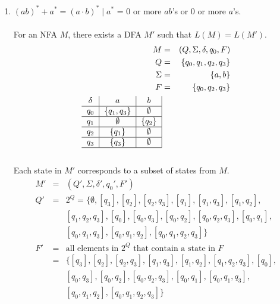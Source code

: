 \documentclass[8pt,letterpaper,twocolumn]{article}
\begin{document}
\begin{enumerate}
  \item $(ab)^* + a^* = (a \cdot b)^* \mid a^*$ = 0 or more $ab$'s or 0 or more $a$'s.\\
  \\
  For an NFA $M$, there exists a DFA $M'$ such that $L(M) = L(M')$.
  \begin{eqnarray*}
    M &=& (Q, \Sigma, \delta, q_0, F)\\
    Q &=& \{q_0,q_1,q_2,q_3\}\\
    \Sigma &=& \{a,b\}\\
    F &=& \{q_0,q_2,q_3\}\\
    \begin{tabular}{c|c|c|}
    $\delta$ & $a$ & $b$ \\ 
    \hline 
    $q_0$ & $\{q_1,q_3\}$ & $\emptyset$ \\
    \hline 
    $q_1$ & $\emptyset$ & $\{q_2\}$ \\ 
    \hline 
    $q_2$ & $\{q_1\}$ & $\emptyset$ \\ 
    \hline 
    $q_3$ & $\{q_3\}$ & $\emptyset$ \\ 
    \hline 
    \end{tabular} 
  \end{eqnarray*}
\\
  Each state in $M'$ corresponds to a subset of states from $M$.
  \begin{eqnarray*}
   M' &=& (Q', \Sigma, \delta', q_0', F')\\
   Q' &=& 2^Q = \{\emptyset, [q_3], [q_2], [q_2,q_3], [q_1], [q_1,q_3],[q_1,q_2],\\
   & & [q_1,q_2,q_3],[q_0], [q_0,q_3], [q_0,q_2], [q_0,q_2,q_3], [q_0,q_1],\\
   & & [q_0,q_1,q_3], [q_0,q_1,q_2], [q_0,q_1,q_2,q_3]\}\\
   F' &=& \mbox{all elements in $2^Q$ that contain a state in $F$}\\
   &=& \{[q_3], [q_2], [q_2,q_3], [q_1,q_3], [q_1,q_2], [q_1,q_2,q_3], [q_0],\\
   & & [q_0,q_3], [q_0,q_2], [q_0,q_2,q_3], [q_0,q_1], [q_0,q_1,q_3],\\
   & & [q_0,q_1,q_2], [q_0,q_1,q_2,q_3]\}
  \end{eqnarray*}
  

\end{enumerate}
\end{document}
